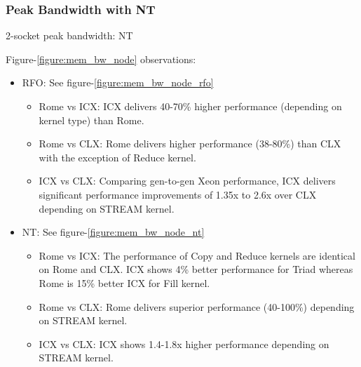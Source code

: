 \documentclass{article}
\begin{document}
\subsubsection{Peak Bandwidth with NT}
\begin{table}[h!]
\centering

\caption{2-socket peak bandwidth: NT}
\label{table:mem_bw_node_nt}
\end{table}

Figure-\ref{figure:mem_bw_node} observations:
   \begin{itemize}
   \item RFO: See figure-\ref{figure:mem_bw_node_rfo}
      \begin{itemize}
         \item Rome vs ICX: ICX delivers 40-70\% higher performance (depending on kernel type) than Rome.
         \item Rome vs CLX: Rome delivers higher performance (38-80\%) than CLX with the exception of Reduce kernel.
         \item ICX vs CLX: Comparing gen-to-gen Xeon performance, ICX delivers significant performance improvements of 1.35x to 2.6x over CLX depending on STREAM kernel.
   \end{itemize}

   \item NT: See figure-\ref{figure:mem_bw_node_nt}
      \begin{itemize}
         \item Rome vs ICX: The performance of Copy and Reduce kernels are identical on Rome and CLX. ICX shows 4\% better performance for Triad whereas Rome is 15\% better ICX for Fill kernel. 
         \item Rome vs CLX: Rome delivers superior performance (40-100\%) depending on STREAM kernel.
         \item ICX vs CLX: ICX shows 1.4-1.8x higher performance depending on STREAM kernel.
      \end{itemize}
   \end{itemize}
\end{document}
